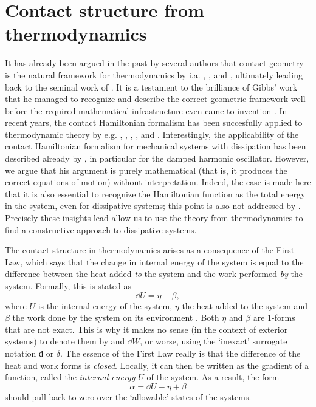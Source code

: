 \section{Contact structure from thermodynamics}
\label{sec:thermodynamics}
It has already been argued in the past by several authors that contact geometry is the natural framework for thermodynamics by i.a. \citet{Arnold1991,Arnold1989a,Arnold1989,Arnold1989b}, \citet{Bamberg1988}, \citet{Burke1985} and \citet{Hermann1973}, ultimately leading back to the seminal work of \citet{Gibbs1873}. It is a testament to the brilliance of Gibbs' work that he managed to recognize and describe the correct geometric framework well before the required mathematical infrastructure even came to invention \cite{Wightman1979}. 
In recent years, the contact Hamiltonian formalism has been succesfully applied to thermodynamic theory by e.g. \citet{Mrugala1991,Mrugala2000,Mrugala1984,Mrugala1985,Mrugala1993,Mrugala1996}, \citet{Balian2001}, \citet{VanderSchaft2021a}, \citet{Bravetti2015}, and \citet{Simoes2020}. Interestingly, the applicability of the contact Hamiltonian formalism for mechanical systems with dissipation has been described already by \citet{Bravetti2017}, in particular for the damped harmonic oscillator. However, we argue that his argument is purely mathematical (that is, it produces the correct equations of motion) without interpretation. Indeed, the case is made here that it is also essential to recognize the Hamiltonian function as the total energy in the system, even for dissipative systems; this point is also not addressed by \citeauthor{Bravetti2017}. Precisely these insights lead allow us to use the theory from thermodynamics to find a constructive approach to dissipative systems.

The contact structure in thermodynamics arises as a consequence of the First Law, which says that the change in internal energy of the system is equal to the difference between the heat added \emph{to} the system and the work performed \emph{by} the system. Formally, this is stated as
\begin{equation}
    \dd{U} = \eta - \beta,
    \label{eq:thermo_first_law}
\end{equation}
where $U$ is the internal energy of the system, $\eta$ the heat added to the system and $\beta$ the work done by the system on its environment \cite{Bamberg1988,Frankel2012}. Both $\eta$ and $\beta$ are 1-forms that are not exact.  This is why it makes no sense (in the context of exterior systems) to denote them by \dj and $\dd{W}$, or worse, using the `inexact' surrogate notation $\text{đ}$ or $\delta$. The essence of the First Law really is that the difference of the heat and work forms is \emph{closed}. Locally, it can then be written as the gradient of a function, called the \emph{internal energy} $U$ of the system. As a result, the form 
$$ \alpha = \dd{U} - \eta + \beta $$
should pull back to zero over the `allowable' states of the systems.

